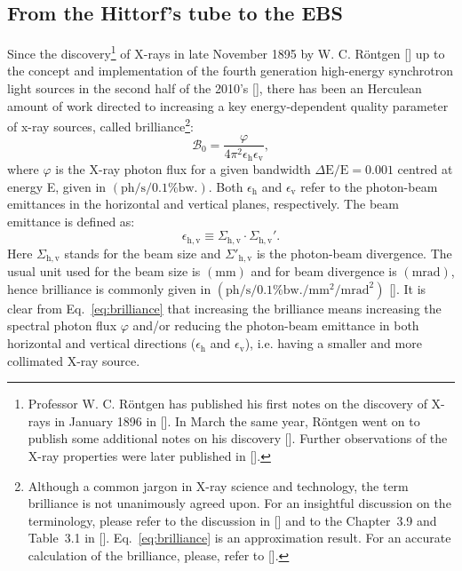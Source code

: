 \begin{refsection}
\section{From the Hittorf's tube to the EBS}\label{sec:sources_intro}
Since the discovery\footnote{Professor W. C. R\"{o}ntgen has published his first notes on the discovery of X-rays in January 1896 in [\cite{Roentgen1896}]. In March the same year, R\"{o}ntgen went on to publish some additional notes on his discovery [\cite{Roentgen1896a}]. Further observations of the X-ray properties were later published in [\cite{Roentgen1897}].} of X-rays in late November 1895 by W. C. R\"{o}ntgen [\cite{Roentgen1896}] up to the concept and implementation of the fourth generation high-energy synchrotron light sources in the second half of the 2010's [\cite{Eriksson2016}], there has been an Herculean amount of work directed to increasing a key energy-dependent quality parameter of x-ray sources, called brilliance\footnote{Although a common jargon in X-ray science and technology, the term brilliance is not unanimously agreed upon. For an insightful discussion on the terminology, please refer to the discussion in [\cite{Mills2005}] and to the Chapter~3.9 and Table~3.1 in [\cite{Talman2006}]. Eq.~\ref{eq:brilliance} is an approximation result. For an accurate calculation of the brilliance, please, refer to [\cite{Walker2019}].}:
\begin{equation}\label{eq:brilliance}
   \mathcal{B}_0 = \frac{\varphi}{4\pi^2\epsilon_\mathrm{h}\epsilon_\mathrm{v}},
\end{equation}{}
where $\varphi$ is the X-ray photon flux for a given bandwidth $\Delta\mathrm{E}/\mathrm{E}=0.001$ centred at energy E,  given in $(\mathrm{ph}/\mathrm{s}/0.1\%\mathrm{bw.})$. Both $\epsilon_\mathrm{h}$ and $\epsilon_\mathrm{v}$ refer to the photon-beam emittances in the horizontal and vertical planes, respectively. The beam emittance is defined as:
\begin{equation}
    \epsilon_{\mathrm{h,v}}\equiv\Sigma_{\mathrm{h,v}}\cdot\Sigma_{\mathrm{h,v}}'.
\end{equation}{}
Here $\Sigma_{\mathrm{h,v}}$ stands for the beam size and $\Sigma'_{\mathrm{h,v}}$ is the photon-beam divergence. The usual unit used for the beam size is $(\mathrm{mm})$ and for beam divergence is $(\mathrm{mrad})$, hence brilliance is commonly given in $(\mathrm{ph}/\mathrm{s}/0.1\%\mathrm{bw.}/\mathrm{mm}^2/\mathrm{mrad}^2)$ [\cite{Kim1986}]. It is clear from Eq.~\ref{eq:brilliance} that increasing the brilliance means increasing the spectral photon flux $\varphi$ and/or reducing the photon-beam emittance in both horizontal and vertical directions ($\epsilon_\mathrm{h}$ and $\epsilon_\mathrm{v}$), i.e. having a smaller and more collimated X-ray source.

\end{refsection}
